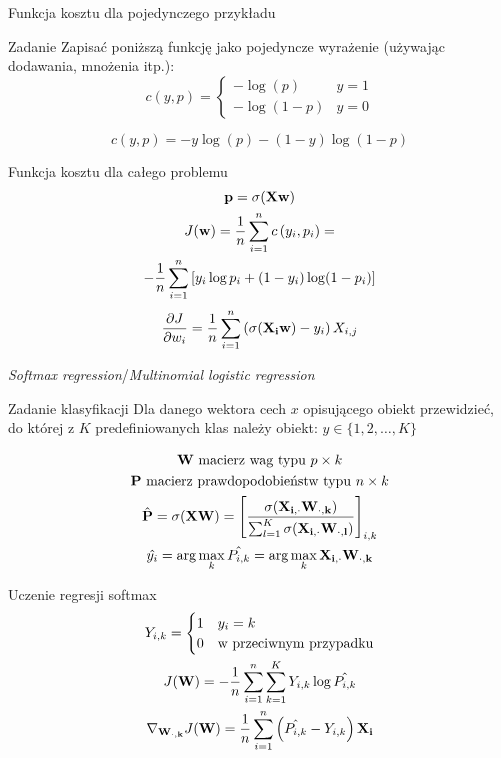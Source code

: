 \documentclass{sa}
\renewcommand{\vec}[1]{\ensuremath\mathbf{#1}}
\newcommand{\grad}{\ensuremath\nabla}
\begin{document}
\begin{frame}{Funkcja kosztu dla pojedynczego przykładu}
\begin{block}{Zadanie}
Zapisać poniższą funkcję jako pojedyncze wyrażenie (używając dodawania, mnożenia itp.):
\[ c(y, p) = \begin{cases} -\log(p) & y=1 \\ -\log(1-p) & y=0 \end{cases} \]
\end{block}
{
\[ c(y,p) = -y\log(p) - (1-y)\log(1-p) \]
}
\end{frame}

\begin{frame}{Funkcja kosztu dla całego problemu}
\begin{gather*}
\vec{p} = \sigma(\vec{X}\vec{w}) \\
J(\vec{w}) = \frac{1}{n} \sum_{i=1}^n c\left(y_i, p_i\right) = \\
-\frac{1}{n} \sum_{i=1}^n \left[ y_i\log p_i + (1-y_i)\log (1-p_i) \right] 
\end{gather*}
\pause
\[\frac{\dd J}{\dd w_i} = \frac{1}{n} \sum_{i=1}^n \left(\sigma(\vec{X_i}\vec{w})-y_i\right)X_{i,j} \]
\end{frame}

\begin{frame}{\emph{Softmax regression}/\emph{Multinomial logistic regression}}
\begin{block}{Zadanie klasyfikacji}
Dla danego wektora cech $x$ opisującego obiekt przewidzieć, do której z $K$ predefiniowanych klas należy obiekt: $y\in \{1, 2, \ldots, K\}$
\end{block}
\begin{gather*}
\vec{W} \text{ macierz wag typu } p\times k \\
\vec{P} \text{ macierz prawdopodobieństw typu } n\times k \\
\hat{\vec{P}} = \sigma(\vec{X}\vec{W}) = \left[ \frac{\sigma(\vec{X_{i,\cdot}}\vec{W_{\cdot,k}})}{\sum_{l=1}^K \sigma(\vec{X_{i,\cdot}}\vec{W_{\cdot,l}})} \right]_{i,k} \\
\hat{y_i} = \arg\max_{k} \hat{P_{i,k}} = \arg\max_{k} \vec{X_{i,\cdot}}\vec{W_{\cdot,k}} \\
\end{gather*}
\end{frame}

\begin{frame}{Uczenie regresji softmax}
\begin{gather*}
Y_{i,k}=\begin{cases} 1 & y_i=k \\ 0 & \text{w przeciwnym przypadku} \end{cases} \\
J(\vec{W}) = -\frac{1}{n} \sum_{i=1}^n \sum_{k=1}^K Y_{i,k}\log\hat{P_{i,k}} \\
\grad_{\vec{W_{\cdot,k}}} J(\vec{W}) = \frac{1}{n}\sum_{i=1}^n \left(\hat{P_{i,k}} - Y_{i,k}\right)\vec{X_{i}}
\end{gather*}
\end{frame}
\end{document}
